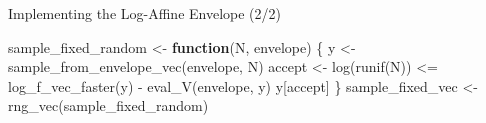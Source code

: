 \documentclass[
  ignorenonframetext,
]{beamer}
\newenvironment{Shaded}{\begin{snugshade}}{\end{snugshade}}
\newcommand{\ControlFlowTok}[1]{\textcolor[rgb]{0.00,0.23,0.31}{\textbf{#1}}}
\newcommand{\FunctionTok}[1]{\textcolor[rgb]{0.28,0.35,0.67}{#1}}
\newcommand{\NormalTok}[1]{\textcolor[rgb]{0.00,0.23,0.31}{#1}}
\newcommand{\OtherTok}[1]{\textcolor[rgb]{0.00,0.23,0.31}{#1}}
\newcommand{\SpecialCharTok}[1]{\textcolor[rgb]{0.37,0.37,0.37}{#1}}
\begin{document}
\begin{frame}[fragile]{Implementing the Log-Affine Envelope (2/2)}
\begin{Shaded}
\begin{Highlighting}[]
\NormalTok{sample\_fixed\_random }\OtherTok{\textless{}{-}} \ControlFlowTok{function}\NormalTok{(N, envelope) \{}
\NormalTok{  y }\OtherTok{\textless{}{-}} \FunctionTok{sample\_from\_envelope\_vec}\NormalTok{(envelope, N)}
\NormalTok{  accept }\OtherTok{\textless{}{-}} \FunctionTok{log}\NormalTok{(}\FunctionTok{runif}\NormalTok{(N)) }\SpecialCharTok{\textless{}=} \FunctionTok{log\_f\_vec\_faster}\NormalTok{(y) }\SpecialCharTok{{-}} \FunctionTok{eval\_V}\NormalTok{(envelope, y)}
\NormalTok{  y[accept]}
\NormalTok{\}}
\NormalTok{sample\_fixed\_vec }\OtherTok{\textless{}{-}} \FunctionTok{rng\_vec}\NormalTok{(sample\_fixed\_random)}
\end{Highlighting}
\end{Shaded}

\normalsize
\end{frame}
\end{document}
